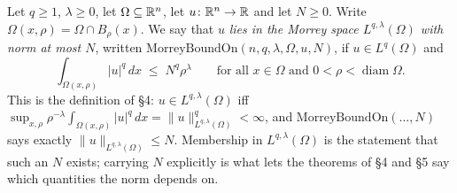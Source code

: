 \begin{definition}
Let $q\ge1$, $\lambda\ge0$, let $\Omega\subseteq\mathbb{R}^n$, let
$u\colon\mathbb{R}^n\to\mathbb{R}$ and let $N\ge0$.  Write $\Omega(x,\rho)=\Omega\cap B_\rho(x)$.
We say that $u$ \emph{lies in the Morrey space $L^{q,\lambda}(\Omega)$ with norm
at most $N$}, written $\mathrm{MorreyBoundOn}(n,q,\lambda,\Omega,u,N)$, if
$u\in L^q(\Omega)$ and
\[
\int_{\Omega(x,\rho)}|u|^q\,dx\;\le\;N^q\rho^{\lambda}
\qquad\text{for all }x\in\Omega\text{ and }0<\rho<\operatorname{diam}\Omega .
\]
This is the definition of \S4: $u\in L^{q,\lambda}(\Omega)$ iff
$\sup_{x,\rho}\rho^{-\lambda}\int_{\Omega(x,\rho)}|u|^q\,dx
=\|u\|^q_{L^{q,\lambda}(\Omega)}<\infty$, and
$\mathrm{MorreyBoundOn}(\dots,N)$ says exactly
$\|u\|_{L^{q,\lambda}(\Omega)}\le N$.  Membership in $L^{q,\lambda}(\Omega)$ is
the statement that such an $N$ exists; carrying $N$ explicitly is what lets the
theorems of \S4 and \S5 say which quantities the norm depends on.
\end{definition}
